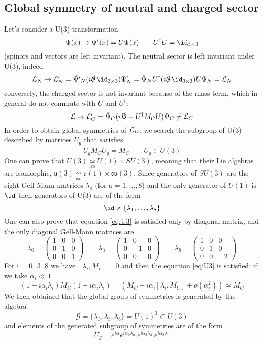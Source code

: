 \documentclass[TheoreticalPhy_ModB.tex]{subfiles}
\begin{document}
\subsection{Global symmetry of neutral and charged sector}
Let's consider a U(3) transformation
\[
\Psi(x) \to \Psi'(x) = U\Psi(x)
\qquad
U^{\dagger}U = \id_{3 \times 3}
\]
(spinors and vectors are left invariant).
The neutral sector is left invariant under U(3), indeed
\[
\mathL_N \to \mathL'_N = \bar{\Psi'}_N (i \slashed \partial \,\id_{3 \times 3})\Psi'_N =
	\bar{\Psi}_N U^{\dagger}(i \slashed \partial \,\id_{3 \times 3})U \Psi_N = \mathL_N
\]
conversely, the charged sector is not invariant because of the mass term, which in general do not commute with $U$ and $U^\dagger$:
\[
\mathcal{L} \to \mathcal{L}'_C = \bar{\Psi}_C ( i \slashed D - U^{\dagger}M_C U)\Psi_C \ne \mathcal{L}_C
\]
In order to obtain global symmetries of $\mathcal{L}_D$, we search the subgroup of U(3) described by matrices $U_g$ that satisfies
\begin{equation}
U^{\dagger}_g M_C U_g = M_C
\qquad
U_g \in U(3)
\label{eq:U3}
\end{equation}
One can prove that $U(3) \underset{\text{iso}}{\simeq} U(1) \times SU(3)$, meaning that their Lie algebras are isomorphic, $\mathfrak u(3) \underset{\text{iso}}{\simeq} \mathfrak u(1) \times \mathfrak{su}(3)$. 
Since generators of $SU(3)$ are the eight Gell-Mann matrices $\lambda_a$ (for a = $1, \dots, 8$) and the only generator of $U(1)$ is $\id$ then generators of U(3) are of the form
\[
\id \times \{ \lambda_1, \dots, \lambda_8 \}
\]
One can also prove that equation \ref{eq:U3} is satisfied only by diagonal matrix, and the only diagonal Gell-Mann matrices are
\[
\lambda_0 =
\begin{pmatrix}
1	& 0 	& 0 \\
0	& 1	& 0 \\
0	& 0	& 1
\end{pmatrix}
\qquad
\lambda_3 =
\begin{pmatrix}
1	& 0 	& 0 \\
0	& -1	& 0 \\
0	& 0	& 0
\end{pmatrix}
\qquad
\lambda_8 =
\begin{pmatrix}
1	& 0 	& 0 \\
0	& 1	& 0 \\
0	& 0	& -2
\end{pmatrix}
\]
For i = 0, 3 ,8 we have $[\lambda_i, M_c] = 0$ and then the equation \ref{eq:U3} is satisfied: if we take $\alpha_i \ll 1$
\[
(1 - i \alpha_i \lambda_i)M_C(1 + i \alpha_i \lambda_i) = (M_C - i \alpha_i [\lambda_i, M_C] + o(\alpha_i^2)) \simeq M_C
\]
We then obtained that the global group of symmetries is generated by the algebra
\[
\mathcal{G} = \{ \lambda_0, \lambda_3, \lambda_8 \} = U(1)^3 \subset U(3)
\]
and elements of the generated subgroup of symmetries are of the form
\[
U_g = e^{i\alpha}e^{i \alpha_0 \lambda_0} \ e^{i \alpha_3 \lambda_3} \ e^{i \alpha_8 \lambda_8}
\]
\end{document}
